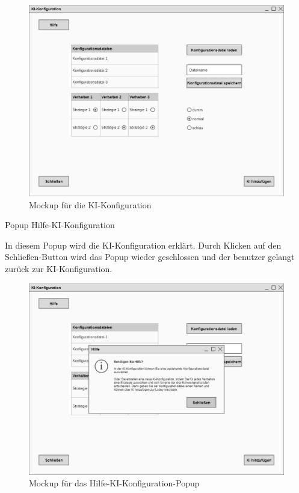 \begin{figure}
  \centering
  \includegraphics[width=\textwidth]{Meilenstein03/KI-Konfiguration_Mockup.png}
  \caption{Mockup für die KI-Konfiguration}
\end{figure}

Popup \glqq{}Hilfe-KI-Konfiguration\grqq{}

In diesem Popup wird die KI-Konfiguration erklärt. Durch Klicken auf den Schließen-Button wird das Popup wieder geschlossen und der benutzer gelangt zurück zur KI-Konfiguration.

\begin{figure}
  \centering
  \includegraphics[width=\textwidth]{Meilenstein03/Hilfe-KI-Konfiguration_Mockup.png}
  \caption{Mockup für das Hilfe-KI-Konfiguration-Popup}
\end{figure}


